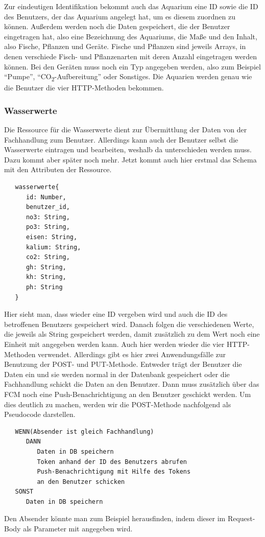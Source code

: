 Zur eindeutigen Identifikation bekommt auch das Aquarium eine ID sowie die ID des Benutzers, der das Aquarium angelegt hat, um es diesem zuordnen zu können. Außerdem werden noch die Daten gespeichert, die der Benutzer eingetragen hat, also eine Bezeichnung des Aquariums, die Maße und den Inhalt, also Fische, Pflanzen und Geräte. Fische und Pflanzen sind jeweils Arrays, in denen verschiede Fisch- und Pflanzenarten mit deren Anzahl eingetragen werden können. Bei den Geräten muss noch ein Typ angegeben werden, also zum Beispiel ``Pumpe'', ``CO\textsubscript{2}-Aufbereitung'' oder Sonstiges. Die Aquarien werden genau wie die Benutzer die vier HTTP-Methoden bekommen. 

\subsubsection{Wasserwerte}

Die Ressource für die Wasserwerte dient zur Übermittlung der Daten von der Fachhandlung zum Benutzer. Allerdings kann auch der Benutzer selbst die Wasserwerte eintragen und bearbeiten, weshalb da unterschieden werden muss. Dazu kommt aber später noch mehr. Jetzt kommt auch hier erstmal das Schema mit den Attributen der Ressource.

\begin{lstlisting}
   wasserwerte{
      id: Number,
      benutzer_id,
      no3: String,
      po3: String,
      eisen: String,
      kalium: String,
      co2: String,
      gh: String,
      kh: String,
      ph: String
   }
\end{lstlisting}

Hier sieht man, dass wieder eine ID vergeben wird und auch die ID des betroffenen Benutzers gespeichert wird. Danach folgen die verschiedenen Werte, die jeweils als String gespeichert werden, damit zusätzlich zu dem Wert noch eine Einheit mit angegeben werden kann. Auch hier werden wieder die vier HTTP-Methoden verwendet. Allerdings gibt es hier zwei Anwendungsfälle zur Benutzung der POST- und PUT-Methode. Entweder trägt der Benutzer die Daten ein und sie werden normal in der Datenbank gespeichert oder die Fachhandlung schickt die Daten an den Benutzer. Dann muss zusätzlich über das FCM noch eine Push-Benachrichtigung an den Benutzer geschickt werden. Um dies deutlich zu machen, werden wir die POST-Methode nachfolgend als Pseudocode darstellen.

\begin{lstlisting}
   WENN(Absender ist gleich Fachhandlung)
      DANN
         Daten in DB speichern
         Token anhand der ID des Benutzers abrufen
         Push-Benachrichtigung mit Hilfe des Tokens 
         an den Benutzer schicken
   SONST
      Daten in DB speichern
\end{lstlisting}

Den Absender könnte man zum Beispiel herausfinden, indem dieser im Request-Body als Parameter mit angegeben wird.

\subsection{}